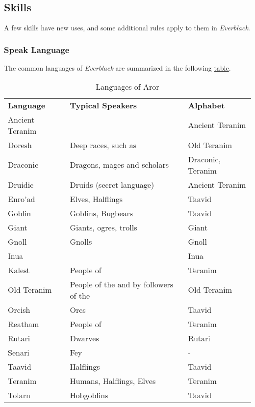 \subsection{Skills}
\label{sec:Skills}

A few skills have new uses, and some additional rules apply to them in
\emph{Everblack}.

\subsubsection{Speak Language}
\label{sec:Speak Language}

The common languages of \emph{Everblack} are summarized in the following
\hyperref[tbl:Languages]{table}.

\begin{table*}[!htb]
  \caption{Languages of Aror} \label{tbl:Languages}
  \begin{tabular}{l p{8cm} l}
    \textbf{Language} & \textbf{Typical Speakers} & \textbf{Alphabet} \\
    Ancient Teranim & \nameref{sec:Tynrikke}      & Ancient Teranim \\
    Doresh          & Deep races, such as \nameref{sec:Deepkin} & Old Teranim \\
    Draconic        & Dragons, mages and scholars & Draconic, Teranim \\
    Druidic         & Druids (secret language)    & Ancient Teranim \\
    Enro'ad         & Elves, Halflings            & Taavid \\
    Goblin          & Goblins, Bugbears           & Taavid \\
    Giant           & Giants, ogres, trolls       & Giant \\
    Gnoll           & Gnolls                      & Gnoll \\
    Inua            & \nameref{sec:Inua}          & Inua \\
    Kalest          & People of \nameref{sec:Arania} & Teranim \\
    Old Teranim     & People of the \nameref{sec:Dirgewood} and by followers of the \nameref{sec:Old Ways} & Old Teranim \\
    Orcish          & Orcs                        & Taavid \\
    Reatham         & People of \nameref{sec:Forsby} & Teranim \\
    Rutari          & Dwarves                     & Rutari \\
    Senari          & Fey                         & - \\
    Taavid          & Halflings                   & Taavid \\
    Teranim         & Humans, Halflings, Elves    & Teranim \\
    Tolarn          & Hobgoblins                  & Taavid \\
  \end{tabular}
\end{table*}

